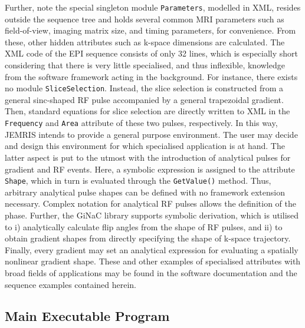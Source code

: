 \documentclass[journal,onecolumn,12pt]{IEEEtran}
\begin{document}
Further, note the special singleton module \verb+Parameters+, modelled in XML, resides outside the sequence tree and
holds several common MRI parameters such as field-of-view, imaging matrix size, and timing parameters, for
convenience. From these, other hidden attributes such as k-space dimensions are calculated. The XML code of the EPI
sequence consists of only 32 lines, which is especially short considering that there is very little specialised, and
thus inflexible, knowledge from the software framework acting in the background. For instance, there exists no module
\verb+SliceSelection+. Instead, the slice selection is constructed from a general sinc-shaped RF pulse accompanied by a
general trapezoidal gradient. Then, standard equations for slice selection are directly written to XML in the
\verb+Frequency+ and \verb+Area+ attribute of these two pulses, respectively. In this way, JEMRIS intends to provide a
general purpose environment. The user may decide and design this environment for which specialised application is at
hand. The latter aspect is put to the utmost with the introduction of analytical pulses for gradient and RF
events. Here, a symbolic expression is assigned to the attribute \verb+Shape+, which in turn is evaluated through the
\verb+GetValue()+ method. Thus, arbitrary analytical pulse shapes can be defined with no framework extension
necessary. Complex notation for analytical RF pulses allows the definition of the phase. Further, the GiNaC library
supports symbolic derivation, which is utilised to i) analytically calculate flip angles from the shape of RF pulses,
and ii) to obtain gradient shapes from directly specifying the shape of k-space trajectory. Finally, every gradient may
set an analytical expression for evaluating a spatially nonlinear gradient shape. These and other examples of
specialised attributes with broad fields of applications may be found in the software documentation and the sequence
examples contained herein.



\subsection{Main Executable Program}
\end{document}
